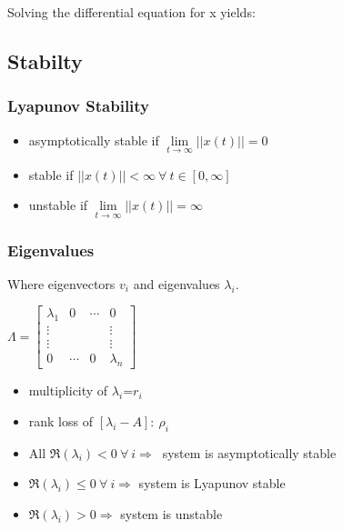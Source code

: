 \documentclass[10pt,a4paper]{scrartcl}
\begin{document}
\begin{multicols*}{3}
Solving the differential equation for x yields:


\subsection{Stabilty}

\subsubsection{Lyapunov Stability}

\begin{itemize}
\item asymptotically stable if $\lim\limits_{t\rightarrow\infty}||x(t)||=0$
\item stable if $||x(t)||<\infty\ \forall\ t\in[0,\infty]$
\item unstable if $\lim\limits_{t\rightarrow\infty}||x(t)||=\infty$
\end{itemize}

\subsubsection{Eigenvalues}


Where eigenvectors $v_i$ and eigenvalues $\lambda_i$.


$\Lambda =\begin{bmatrix}\lambda_1&0&\cdots&0\\\vdots&&&\vdots\\\vdots&&&\vdots\\0&\cdots&0&\lambda_n\end{bmatrix}$

\begin{itemize}
\item multiplicity of $\lambda_i$=$r_i$
\item rank loss of $[\lambda_i-A]:\ \rho_i$
\end{itemize}

\begin{itemize}
\item All $\Re(\lambda_i)<0\ \forall\ i\Rightarrow\ $ system is asymptotically stable
\item $\Re(\lambda_i)\leq0\ \forall\ i\Rightarrow$ system is Lyapunov stable
\item $\Re(\lambda_i)>0\Rightarrow$ system is unstable
\end{itemize}


\end{multicols*}
\end{document}
